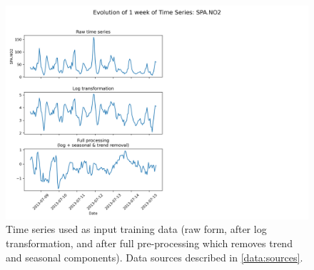 \documentclass[12pt,a4paper]{book}
\begin{document}
\begin{figure}[h]
  \centering  
  \includegraphics[width=\textwidth]{time_series_page_7.png}
  \caption{Time series used as input training data (raw form, after log transformation, and after full pre-processing which removes trend and seasonal components). Data sources described in \ref{data:sources}.}
  \label{fig:evo_ts7}
\end{figure}
\end{document}
